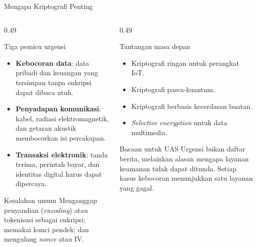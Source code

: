\documentclass[aspectratio=169,11pt]{beamer}
\begin{document}
\begin{frame}{Mengapa Kriptografi Penting}
    \footnotesize
    \begin{columns}[T,onlytextwidth]
        \begin{column}{0.49\textwidth}
            \begin{block}{Tiga pemicu urgensi}
                \begin{itemize}
                    \setlength{\itemsep}{2pt}
                    \item \textbf{Kebocoran data}: data pribadi dan keuangan
                          yang tersimpan tanpa enkripsi dapat dibaca utuh.
                    \item \textbf{Penyadapan komunikasi}: kabel, radiasi
                          elektromagnetik, dan getaran akustik membocorkan isi
                          percakapan.
                    \item \textbf{Transaksi elektronik}: tanda terima, perintah
                          bayar, dan identitas digital harus dapat dipercaya.
                \end{itemize}
            \end{block}
            \begin{exampleblock}{Kesalahan umum}
                \footnotesize
                Menganggap penyandian (\textit{encoding}) atau tokenisasi
                sebagai enkripsi; memakai kunci pendek; dan mengulang
                \textit{nonce} atau IV.
            \end{exampleblock}
        \end{column}
        \begin{column}{0.49\textwidth}
            \begin{block}{Tantangan masa depan}
                \begin{itemize}
                    \setlength{\itemsep}{2pt}
                    \item Kriptografi ringan untuk perangkat IoT.
                    \item Kriptografi pasca-kuantum.
                    \item Kriptografi berbasis kecerdasan buatan.
                    \item \textit{Selective encryption} untuk data multimedia.
                \end{itemize}
            \end{block}
            \begin{alertblock}{Bacaan untuk UAS}
                \footnotesize
                Urgensi bukan daftar berita, melainkan alasan mengapa layanan
                keamanan tidak dapat ditunda. Setiap kasus kebocoran menunjukkan
                satu layanan yang gagal.
            \end{alertblock}
        \end{column}
    \end{columns}
\end{frame}
\end{document}
